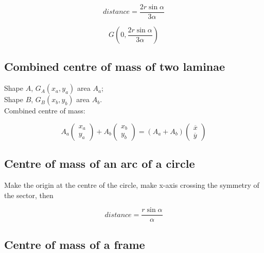 \documentclass[a4paper,9pt]{scrartcl}
\begin{document}
    \begin{displaymath}
        distance = \frac{2r\sin\alpha}{3\alpha}
    \end{displaymath}

    \begin{displaymath}
        G\left( 0, \frac{2r\sin\alpha}{3\alpha} \right)
    \end{displaymath}

    \subsection{Combined centre of mass of two laminae}
    Shape $A$, $G_A(x_a, y_a)$ area $A_a$; \\
    Shape $B$, $G_B(x_b, y_b)$ area $A_b$. \\
    Combined centre of mass:

    \begin{displaymath}
        A_a\begin{pmatrix}
               x_a \\
               y_a
        \end{pmatrix} +A_b\begin{pmatrix}
                              x_b \\
                              y_b
        \end{pmatrix}=(A_a+A_b)\begin{pmatrix}
                                   \overline{x}\\
                                   \overline{y}
        \end{pmatrix}
    \end{displaymath}

    \subsection{Centre of mass of an arc of a circle}

    Make the origin at the centre of the circle, make x-axis crossing the symmetry of the sector, then

    \begin{displaymath}
        distance = \frac{r\sin\alpha}{\alpha}
    \end{displaymath}

    \subsection{Centre of mass of a frame}
\end{document}
